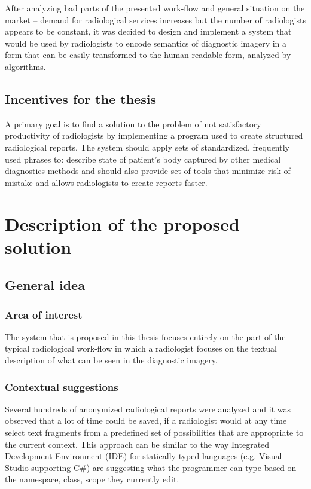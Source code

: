 \documentclass[12pt, twoside, openany]{report}
\theoremstyle{definition}
\begin{document}
After analyzing bad parts of the presented work-flow and general situation on the market -- demand for radiological services increases but the number of radiologists appears to be constant, it was decided to design and implement a system that would be used by radiologists to encode semantics of diagnostic imagery in a form that can be easily transformed to the human readable form, analyzed by algorithms. 

\section{Incentives for the thesis}
A primary goal is to find a solution to the problem of not satisfactory productivity of radiologists by implementing a program used to create structured radiological reports. The system should apply sets of standardized, frequently used phrases to: describe state of patient's body captured by other medical diagnostics methods and should also provide set of tools that minimize risk of mistake and allows radiologists to create reports faster. 



\chapter{Description of the proposed solution}
\section{General idea}
\subsection{Area of interest}
The system that is proposed in this thesis focuses entirely on the part of the typical radiological work-flow in which a radiologist focuses on the textual description of what can be seen in the diagnostic imagery.
\subsection{Contextual suggestions}
Several hundreds of anonymized radiological reports were analyzed and it was observed that a lot of time could be saved, if a radiologist would at any time select text fragments from a predefined set of possibilities that are appropriate to the current context. This approach can be similar to the way Integrated Development Environment (IDE) for statically typed languages (e.g. Visual Studio supporting C\#) are suggesting what the programmer can type based on the namespace, class, scope they currently edit.
\end{document}
